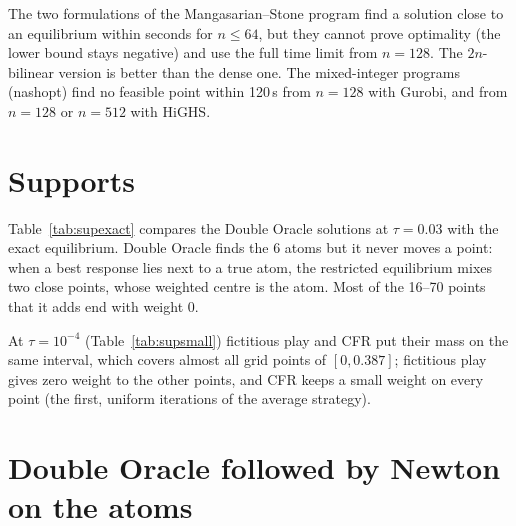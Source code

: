 \documentclass[10pt,a4paper]{article}
\begin{document}
The two formulations of the Mangasarian--Stone program find a solution close to an equilibrium
within seconds for $n\le64$, but they cannot prove optimality (the lower bound stays negative)
and use the full time limit from $n=128$. The $2n$-bilinear version is better than the dense one.
The mixed-integer programs (nashopt) find no feasible point within 120\,s from $n=128$ with
Gurobi, and from $n=128$ or $n=512$ with HiGHS.

\section{Supports}

Table~\ref{tab:supexact} compares the Double Oracle solutions at $\tau=0.03$ with the exact
equilibrium. Double Oracle finds the 6 atoms but it never moves a point: when a best response lies
next to a true atom, the restricted equilibrium mixes two close points, whose weighted centre is
the atom. Most of the 16--70 points that it adds end with weight 0.

\begin{table}[H]
\centering\small

\caption{Double Oracle against the exact 6 atoms, $\tau=0.03$. Each support point is assigned to
the nearest exact atom; errors are for the weighted centres and the summed weights.}
\label{tab:supexact}
\end{table}

\begin{table}[H]
\centering\small

\caption{Supports at $\tau=10^{-4}$ (best result of each method).}
\label{tab:supsmall}
\end{table}

At $\tau=10^{-4}$ (Table~\ref{tab:supsmall}) fictitious play and CFR put their mass on the same
interval, which covers almost all grid points of $[0,0.387]$; fictitious play gives zero weight to
the other points, and CFR keeps a small weight on every point (the first, uniform iterations of the
average strategy).

\section{Double Oracle followed by Newton on the atoms}
\label{sec:hybrid}
\end{document}
